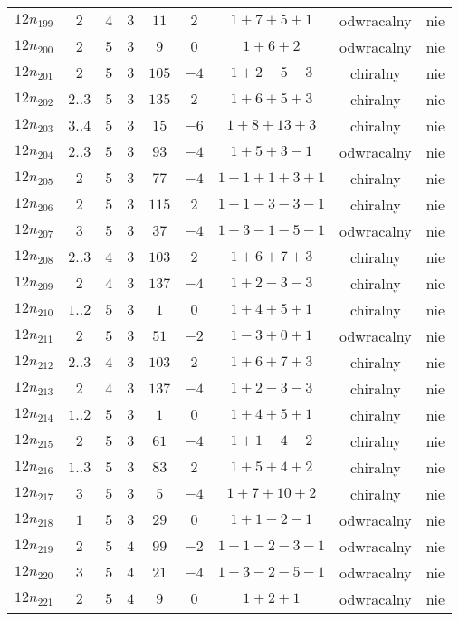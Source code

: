 \begin{longtable}{ccccccccc}
$12n_{199}$ & $2$ & $4$ & $3$ & $11$ & $2$ & $1+7+5+1$ & odwracalny & nie \\
$12n_{200}$ & $2$ & $5$ & $3$ & $9$ & $0$ & $1+6+2$ & odwracalny & nie \\
$12n_{201}$ & $2$ & $5$ & $3$ & $105$ & $-4$ & $1+2-5-3$ & chiralny & nie \\
$12n_{202}$ & $2..3$ & $5$ & $3$ & $135$ & $2$ & $1+6+5+3$ & chiralny & nie \\
$12n_{203}$ & $3..4$ & $5$ & $3$ & $15$ & $-6$ & $1+8+13+3$ & chiralny & nie \\
$12n_{204}$ & $2..3$ & $5$ & $3$ & $93$ & $-4$ & $1+5+3-1$ & odwracalny & nie \\
$12n_{205}$ & $2$ & $5$ & $3$ & $77$ & $-4$ & $1+1+1+3+1$ & chiralny & nie \\
$12n_{206}$ & $2$ & $5$ & $3$ & $115$ & $2$ & $1+1-3-3-1$ & chiralny & nie \\
$12n_{207}$ & $3$ & $5$ & $3$ & $37$ & $-4$ & $1+3-1-5-1$ & odwracalny & nie \\
$12n_{208}$ & $2..3$ & $4$ & $3$ & $103$ & $2$ & $1+6+7+3$ & chiralny & nie \\
$12n_{209}$ & $2$ & $4$ & $3$ & $137$ & $-4$ & $1+2-3-3$ & chiralny & nie \\
$12n_{210}$ & $1..2$ & $5$ & $3$ & $1$ & $0$ & $1+4+5+1$ & chiralny & nie \\
$12n_{211}$ & $2$ & $5$ & $3$ & $51$ & $-2$ & $1-3+0+1$ & odwracalny & nie \\
$12n_{212}$ & $2..3$ & $4$ & $3$ & $103$ & $2$ & $1+6+7+3$ & chiralny & nie \\
$12n_{213}$ & $2$ & $4$ & $3$ & $137$ & $-4$ & $1+2-3-3$ & chiralny & nie \\
$12n_{214}$ & $1..2$ & $5$ & $3$ & $1$ & $0$ & $1+4+5+1$ & chiralny & nie \\
$12n_{215}$ & $2$ & $5$ & $3$ & $61$ & $-4$ & $1+1-4-2$ & chiralny & nie \\
$12n_{216}$ & $1..3$ & $5$ & $3$ & $83$ & $2$ & $1+5+4+2$ & chiralny & nie \\
$12n_{217}$ & $3$ & $5$ & $3$ & $5$ & $-4$ & $1+7+10+2$ & chiralny & nie \\
$12n_{218}$ & $1$ & $5$ & $3$ & $29$ & $0$ & $1+1-2-1$ & odwracalny & nie \\
$12n_{219}$ & $2$ & $5$ & $4$ & $99$ & $-2$ & $1+1-2-3-1$ & odwracalny & nie \\
$12n_{220}$ & $3$ & $5$ & $4$ & $21$ & $-4$ & $1+3-2-5-1$ & odwracalny & nie \\
$12n_{221}$ & $2$ & $5$ & $4$ & $9$ & $0$ & $1+2+1$ & odwracalny & nie \\

\end{longtable}
